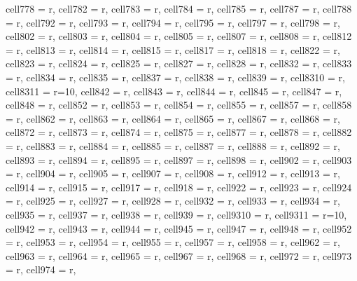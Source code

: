 \begin{longtblr}[
  caption = {Linear model estimating all the considered metrics in every alternative scenario.},
  label = {tab:appendix_LCBM_all_metrics_all_scenarios}
]
{  cell{77}{8} = {r},
  cell{78}{2} = {r},
  cell{78}{3} = {r},
  cell{78}{4} = {r},
  cell{78}{5} = {r},
  cell{78}{7} = {r},
  cell{78}{8} = {r},
  cell{79}{2} = {r},
  cell{79}{3} = {r},
  cell{79}{4} = {r},
  cell{79}{5} = {r},
  cell{79}{7} = {r},
  cell{79}{8} = {r},
  cell{80}{2} = {r},
  cell{80}{3} = {r},
  cell{80}{4} = {r},
  cell{80}{5} = {r},
  cell{80}{7} = {r},
  cell{80}{8} = {r},
  cell{81}{2} = {r},
  cell{81}{3} = {r},
  cell{81}{4} = {r},
  cell{81}{5} = {r},
  cell{81}{7} = {r},
  cell{81}{8} = {r},
  cell{82}{2} = {r},
  cell{82}{3} = {r},
  cell{82}{4} = {r},
  cell{82}{5} = {r},
  cell{82}{7} = {r},
  cell{82}{8} = {r},
  cell{83}{2} = {r},
  cell{83}{3} = {r},
  cell{83}{4} = {r},
  cell{83}{5} = {r},
  cell{83}{7} = {r},
  cell{83}{8} = {r},
  cell{83}{9} = {r},
  cell{83}{10} = {r},
  cell{83}{11} = {r=10}{},
  cell{84}{2} = {r},
  cell{84}{3} = {r},
  cell{84}{4} = {r},
  cell{84}{5} = {r},
  cell{84}{7} = {r},
  cell{84}{8} = {r},
  cell{85}{2} = {r},
  cell{85}{3} = {r},
  cell{85}{4} = {r},
  cell{85}{5} = {r},
  cell{85}{7} = {r},
  cell{85}{8} = {r},
  cell{86}{2} = {r},
  cell{86}{3} = {r},
  cell{86}{4} = {r},
  cell{86}{5} = {r},
  cell{86}{7} = {r},
  cell{86}{8} = {r},
  cell{87}{2} = {r},
  cell{87}{3} = {r},
  cell{87}{4} = {r},
  cell{87}{5} = {r},
  cell{87}{7} = {r},
  cell{87}{8} = {r},
  cell{88}{2} = {r},
  cell{88}{3} = {r},
  cell{88}{4} = {r},
  cell{88}{5} = {r},
  cell{88}{7} = {r},
  cell{88}{8} = {r},
  cell{89}{2} = {r},
  cell{89}{3} = {r},
  cell{89}{4} = {r},
  cell{89}{5} = {r},
  cell{89}{7} = {r},
  cell{89}{8} = {r},
  cell{90}{2} = {r},
  cell{90}{3} = {r},
  cell{90}{4} = {r},
  cell{90}{5} = {r},
  cell{90}{7} = {r},
  cell{90}{8} = {r},
  cell{91}{2} = {r},
  cell{91}{3} = {r},
  cell{91}{4} = {r},
  cell{91}{5} = {r},
  cell{91}{7} = {r},
  cell{91}{8} = {r},
  cell{92}{2} = {r},
  cell{92}{3} = {r},
  cell{92}{4} = {r},
  cell{92}{5} = {r},
  cell{92}{7} = {r},
  cell{92}{8} = {r},
  cell{93}{2} = {r},
  cell{93}{3} = {r},
  cell{93}{4} = {r},
  cell{93}{5} = {r},
  cell{93}{7} = {r},
  cell{93}{8} = {r},
  cell{93}{9} = {r},
  cell{93}{10} = {r},
  cell{93}{11} = {r=10}{},
  cell{94}{2} = {r},
  cell{94}{3} = {r},
  cell{94}{4} = {r},
  cell{94}{5} = {r},
  cell{94}{7} = {r},
  cell{94}{8} = {r},
  cell{95}{2} = {r},
  cell{95}{3} = {r},
  cell{95}{4} = {r},
  cell{95}{5} = {r},
  cell{95}{7} = {r},
  cell{95}{8} = {r},
  cell{96}{2} = {r},
  cell{96}{3} = {r},
  cell{96}{4} = {r},
  cell{96}{5} = {r},
  cell{96}{7} = {r},
  cell{96}{8} = {r},
  cell{97}{2} = {r},
  cell{97}{3} = {r},
  cell{97}{4} = {r},
}
\end{longtblr}
